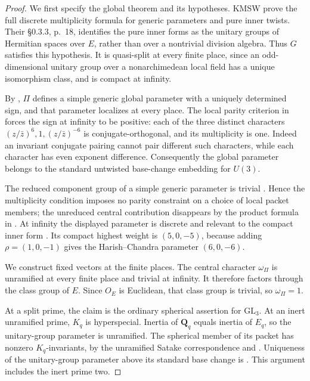 \begin{proof}
We first specify the global theorem and its hypotheses. KMSW
\cite[Theorem~5.0.5 and its preceding paragraph, p.~206]{K17KMSW2014}
prove the full discrete multiplicity formula for generic parameters and
pure inner twists. Their \S0.3.3, p.~18, identifies the pure inner forms
as the unitary groups of Hermitian spaces over $E$, rather than over a
nontrivial division algebra. Thus $G$ satisfies this hypothesis. It is
quasi-split at every finite place, since an odd-dimensional unitary group
over a nonarchimedean local field has a unique isomorphism class, and is
compact at infinity.

By \cite[Propositions~1.3.1 and~1.3.3, pp.~67, 70--71]{K17KMSW2014},
$\Pi$ defines a simple generic global parameter with a uniquely determined
sign, and that parameter localizes at every place. The local parity
criterion in \cite[\S1.2.3 and Lemma~1.2.5, pp.~59--61]{K17KMSW2014}
forces the sign at infinity to be positive: each of the three distinct
characters $(z/\bar z)^6,1,(z/\bar z)^{-6}$ is conjugate-orthogonal,
and its multiplicity is one. Indeed an invariant conjugate pairing cannot
pair different such characters, while each character has even exponent
difference. Consequently the global parameter belongs to the standard
untwisted base-change embedding for $U(3)$.

The reduced component group of a simple generic parameter is trivial
\cite[\S1.3.4--1.3.5, pp.~69--70]{K17KMSW2014}. Hence the multiplicity
condition imposes no parity constraint on a choice of local packet members;
the unreduced central contribution disappears by the product formula in
\cite[\S1.7, pp.~88--89]{K17KMSW2014}. At infinity the displayed parameter
is discrete and relevant to the compact inner form
\cite[Remark~A.11.8, p.~236]{K17BCFamilies2009}. Its compact highest weight
is $(5,0,-5)$, because adding $\rho=(1,0,-1)$ gives the Harish--Chandra
parameter $(6,0,-6)$.

We construct fixed vectors at the finite places. The central character
$\omega_\Pi$ is unramified at every finite place and trivial at infinity.
It therefore factors through the class group of $E$. Since $O_E$ is
Euclidean, that class group is trivial, so $\omega_\Pi=1$.

At a split prime, the claim is the ordinary spherical assertion for
$\mathrm{GL}_3$. At an inert unramified prime, $K_q$ is hyperspecial.
Inertia of $\mathbf Q_q$ equals inertia of $E_q$, so the unitary-group
parameter is unramified. The spherical member of its packet has nonzero
$K_q$-invariants, by the unramified Satake correspondence and
\cite[Proposition~1.5.2(5), p.~79]{K17KMSW2014}.
Uniqueness of the unitary-group parameter above its standard base change
is \cite[Lemma~1.2.5]{K17KMSW2014}. This argument includes the inert
prime two.


\end{proof}

